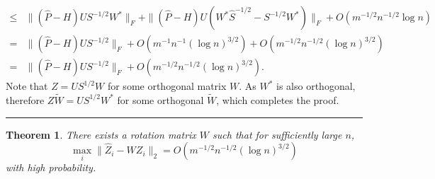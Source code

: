 \documentclass[a4paper]{article}
\newenvironment{proof}{{\bf Proof:  }}{\hfill\rule{2mm}{2mm}}
\newtheorem{theorem}[fact]{Theorem}
\renewcommand{\hat}{\widehat}
\renewcommand{\tilde}{\widetilde}
\begin{document}
\begin{proof}
\begin{align*}
    \le & \| (\hat{P} - H) U S^{-1/2} W^* \|_F + \|(\hat{P} - H) U (W^* \hat{S}^{-1/2} - S^{-1/2} W^*) \|_F + O(m^{-1/2} n^{-1/2} \log n) \\
    = & \| (\hat{P} - H) U S^{-1/2}\|_F + O(m^{-1} n^{-1} (\log n)^{3/2}) + O(m^{-1/2} n^{-1/2} (\log n)^{3/2}) \\
    = & \| (\hat{P} - H) U S^{-1/2}\|_F + O(m^{-1/2} n^{-1/2} (\log n)^{3/2}).
\end{align*}
Note that $Z = U S^{1/2} W$ for some orthogonal matrix $W$. As $W^*$ is also orthogonal, therefore $Z \tilde{W} = U S^{1/2} W^*$ for some orthogonal $\tilde{W}$, which completes the proof.
\end{proof}

\begin{theorem}
\label{thm:XhatDiffXWL1}
There exists a rotation matrix $W$ such that for sufficiently large $n$,
\[
	\max_i \| \hat{Z}_i - W Z_i \|_2 = O(m^{-1/2} n^{-1/2} (\log n)^{3/2})
\]
with high probability.
\end{theorem}
\end{document}

